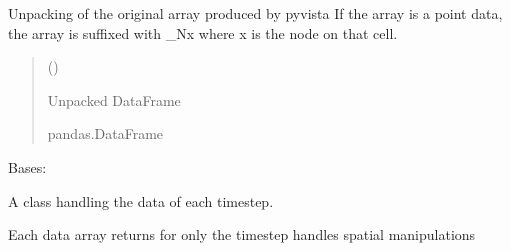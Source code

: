\documentclass[letterpaper,10pt,english]{sphinxmanual}
\begin{document}
\begin{fulllineitems}
\begin{fulllineitems}
\begin{quote}
\begin{description}
\end{description}\end{quote}

\end{fulllineitems}


\begin{fulllineitems}
\label{\detokenize{openfdem:openfdem.openfdem.Model.unpack_DataFrame}}
\pysigstartsignatures
{}
\pysigstopsignatures
\sphinxAtStartPar
Unpacking of the original array produced by pyvista
If the array is a point data, the array is suffixed with \_Nx where x is the node on that cell.
\begin{quote}\begin{description}
\sphinxAtStartPar
{} () \textendash{} 

\sphinxAtStartPar
Unpacked DataFrame

\sphinxAtStartPar
pandas.DataFrame

\end{description}\end{quote}

\end{fulllineitems}


\end{fulllineitems}


\begin{fulllineitems}
\label{\detokenize{openfdem:openfdem.openfdem.Timestep}}
\pysigstartsignatures
{}
\pysigstopsignatures
\sphinxAtStartPar
Bases: 

\sphinxAtStartPar
A class handling the data of each timestep.

\sphinxAtStartPar
Each data array returns for only the timestep
handles spatial manipulations

\end{fulllineitems}
\end{document}
